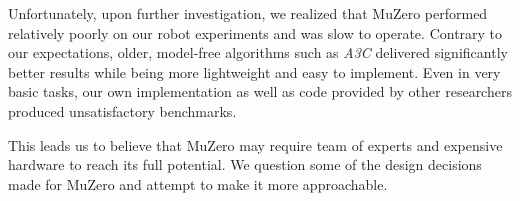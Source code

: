 Unfortunately, upon further investigation, we realized that MuZero performed relatively poorly on our robot experiments and was slow to operate. Contrary to our expectations, older, model-free algorithms such as \textit{A3C} \cite{a3c} delivered significantly better results while being more lightweight and easy to implement. Even in very basic tasks, our own implementation as well as code provided by other researchers produced unsatisfactory benchmarks.

This leads us to believe that MuZero may require team of experts and expensive hardware to reach its full potential. We question some of the design decisions made for MuZero and attempt to make it more approachable.